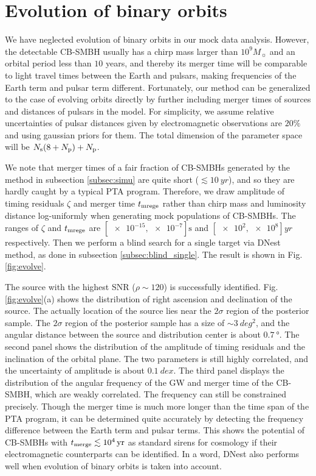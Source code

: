 \documentclass[times,tight]{aastex631}
\begin{document}
\section{Evolution of binary orbits \label{sec:evolution}}
We have neglected evolution of binary orbits in our mock data analysis.
However, the detectable CB-SMBH usually has a chirp mass larger than $10^9 M_{\sun}$ and an orbital period less than $10$ years, and thereby its merger time will be comparable to light travel times between the Earth and pulsars, making frequencies of the Earth term and pulsar term different.
Fortunately, our method can be generalized to the case of evolving orbits directly by further including merger times of sources and distances of pulsars in the model.
For simplicity, we assume relative uncertainties of pulsar distances given by electromagnetic observations are $20\%$ and using gaussian priors for them.
The total dimension of the parameter space will be $N_{\rm s}(8 + N_{\rm p}) + N_{\rm p}$.

We note that merger times of a fair fraction of CB-SMBHs generated by the method in subsection \ref{subsec:simu} are quite short ($\lesssim \SI{10}{yr}$), and so they are hardly caught by a typical PTA program.
Therefore, we draw amplitude of timing residuals $\zeta$ and merger time $t_{\rm mrege}$ rather than chirp mass and luminosity distance log-uniformly when generating mock populations of CB-SMBHs.
The ranges of $\zeta$ and $t_{\rm mrege}$ are $[\num{e-15},\num{e-7}]\si{\second}$ and $[\num{e2},\num{e8}]\si{yr}$ respectively.
Then we perform a blind search for a single target via DNest method, as done in subsection \ref{subsec:blind_single}.
The result is shown in Fig. \ref{fig:evolve}.

The source with the highest SNR ($\rho \sim 120$) is successfully identified.
Fig. \ref{fig:evolve}(a) shows the distribution of right ascension and declination of the source.
The actually location of the source lies near the $2\sigma$ region of the posterior sample.
The $2\sigma$ region of the posterior sample has a size of $\sim \SI{3}{deg^2}$, and the angular distance between the source and distribution center is about $\SI{0.7}{\degree}$.
The second panel shows the distribution of the amplitude of timing residuals and the inclination of the orbital plane.
The two parameters is still highly correlated, and the uncertainty of amplitude is about $\SI{0.1}{dex}$.
The third panel displays the distribution of the angular frequency of the GW and merger time of the CB-SMBH, which are weakly correlated.
The frequency can still be constrained precisely.
Though the merger time is much more longer than the time span of the PTA program, it can be determined quite accurately by detecting the frequency difference between the Earth term and pulsar terms.
This shows the potential of CB-SMBHs with $t_{\rm merge} \lesssim \SI{e4}{yr}$ as standard sirens for cosmology if their electromagnetic counterparts can be identified.
In a word, DNest also performs well when evolution of binary orbits is taken into account.
\end{document}
